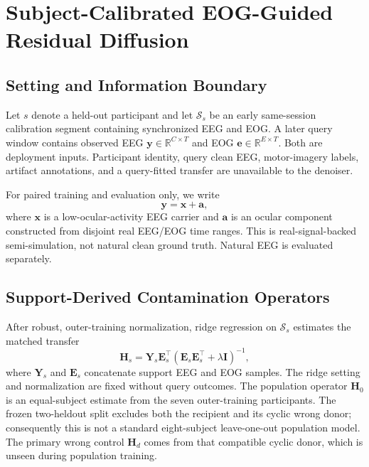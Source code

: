 \section{Subject-Calibrated EOG-Guided Residual Diffusion}
\label{sec:method}

\subsection{Setting and Information Boundary}
Let $s$ denote a held-out participant and let $\mathcal S_s$ be an early
same-session calibration segment containing synchronized EEG and EOG. A later
query window contains observed EEG $\mathbf y\in\mathbb R^{C\times T}$ and EOG
$\mathbf e\in\mathbb R^{E\times T}$. Both are deployment inputs. Participant
identity, query clean EEG, motor-imagery labels, artifact annotations, and a
query-fitted transfer are unavailable to the denoiser.

For paired training and evaluation only, we write
\begin{equation}
  \mathbf y=\mathbf x+\mathbf a,
  \label{eq:paired_observation}
\end{equation}
where $\mathbf x$ is a low-ocular-activity EEG carrier and $\mathbf a$ is an
ocular component constructed from disjoint real EEG/EOG time ranges. This is
real-signal-backed semi-simulation, not natural clean ground truth. Natural EEG
is evaluated separately.

\subsection{Support-Derived Contamination Operators}
After robust, outer-training normalization, ridge regression on $\mathcal S_s$
estimates the matched transfer
\begin{equation}
  \mathbf H_s=\mathbf Y_s\mathbf E_s^\top
  (\mathbf E_s\mathbf E_s^\top+\lambda\mathbf I)^{-1},
  \label{eq:operator}
\end{equation}
where $\mathbf Y_s$ and $\mathbf E_s$ concatenate support EEG and EOG samples.
The ridge setting and normalization are fixed without query outcomes. The
population operator $\mathbf H_0$ is an equal-subject estimate from the seven
outer-training participants. The frozen two-heldout split excludes both the
recipient and its cyclic wrong donor; consequently this is not a standard
eight-subject leave-one-out population model. The primary wrong control
$\mathbf H_d$ comes from that compatible cyclic donor, which is unseen during
population training.


